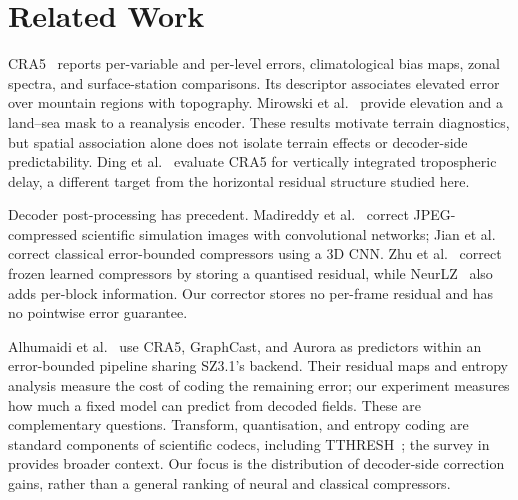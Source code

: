 \section{Related Work}
\label{sec:related}

CRA5~\cite{han2024,cra5journal} reports per-variable and per-level errors,
climatological bias maps, zonal spectra, and surface-station comparisons. Its
descriptor associates elevated error over mountain regions with topography.
Mirowski et al.~\cite{mirowski2024} provide elevation and a land--sea mask to a
reanalysis encoder. These results motivate terrain diagnostics, but spatial
association alone does not isolate terrain effects or decoder-side predictability.
Ding et al.~\cite{xu2025} evaluate CRA5 for vertically integrated tropospheric
delay, a different target from the horizontal residual structure studied here.

Decoder post-processing has precedent. Madireddy et al.~\cite{madireddy2021}
correct JPEG-compressed scientific simulation images with convolutional networks;
Jian et al.~\cite{jian2025} correct classical error-bounded compressors using a
3D CNN. Zhu et al.~\cite{zhu2026} correct frozen learned compressors by storing a
quantised residual, while NeurLZ~\cite{neurlz} also adds per-block information.
Our corrector stores no per-frame residual and has no pointwise error guarantee.

Alhumaidi et al.~\cite{alhumaidi2026} use CRA5, GraphCast, and Aurora as
predictors within an error-bounded pipeline sharing SZ3.1's backend. Their
residual maps and entropy analysis measure the cost of coding the remaining
error; our experiment measures how much a fixed model can predict from decoded
fields. These are complementary questions. Transform, quantisation, and entropy
coding are standard components of scientific codecs, including
TTHRESH~\cite{ballester2019}; the survey in~\cite{survey2025} provides broader
context. Our focus is the distribution of decoder-side correction gains, rather
than a general ranking of neural and classical compressors.
